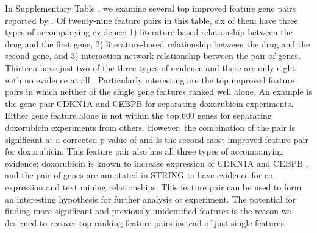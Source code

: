 In Supplementary Table , we examine several top improved feature gene pairs reported by \sampOpt {}. Of twenty-nine feature pairs in this table, six of them have three types of accompanying evidence: 1) literature-based relationship between the drug and the first gene, 2) literature-based relationship between the drug and the second gene, and 3) interaction network relationship between the pair of genes. Thirteen have just two of the three types of evidence and there are only eight with no evidence at all . Particularly interesting are the top improved feature pairs in which neither of the single gene features ranked well alone. An example is the gene pair CDKN1A and CEBPB for separating doxorubicin experiments. Either gene feature alone is not within the top 600 genes for separating doxorubicin experiments from others. However, the combination of the pair is significant at a corrected p-value of  and is the second most improved feature pair for doxorubicin. This feature pair also has all three types of accompanying evidence; doxorubicin is known to increase expression of CDKN1A  and CEBPB , and the pair of genes are annotated in STRING to have evidence for co-expression and text mining relationships.  This feature pair can be used to form an interesting hypothesis for further analysis or experiment. The potential for finding more significant and previously unidentified features is the reason we designed \genviz to recover top ranking feature pairs instead of just single features.



